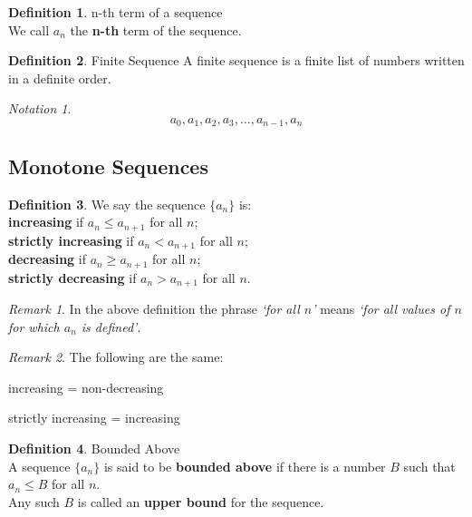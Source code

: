 \documentclass[10pt,a4paper,titlepage,twoside,draft]{article}
\theoremstyle{plain}
\theoremstyle{definition}
\newtheorem{defn}{Definition}
\theoremstyle{remark}
\newtheorem{rem}{Remark}
\newtheorem{nota}{Notation}
\begin{document}
\smallskip

\begin{defn}{n-th term of a sequence} \\
We call $a_{n}$ the \textbf{n-th} term of the sequence.
\end{defn}

\medskip

\begin{defn}{Finite Sequence} 
A finite sequence is a finite list of numbers written in a definite order.
\end{defn}

\smallskip

\begin{nota}
\[ a_{0}, a_{1}, a_{2}, a_{3}, \ldots, a_{n-1}, a_{n} \]
\end{nota}

\subsection{Monotone Sequences}

\begin{defn} 
We say the sequence $\{a_{n} \}$ is: \\
\textbf{increasing} if $a_{n} \leq a_{n+1}$ for all $n$; \\
\textbf{strictly increasing} if $a_{n} < a_{n+1}$ for all $n$; \\
\textbf{decreasing} if $a_{n} \geq a_{n+1}$ for all $n$; \\
\textbf{strictly decreasing} if $a_{n} > a_{n+1}$ for all $n$.
\end{defn}

\medskip

\begin{rem}
In the above definition the phrase \textit{`for all $n$'} means \textit{`for all values of $n$ for which $a_{n}$ is defined'}.
\end{rem}

\medskip

\begin{rem}
The following are the same:

increasing = non-decreasing

strictly increasing = increasing 
\end{rem}

\bigskip

\begin{defn}{Bounded Above} \\
A sequence $\{ a_{n} \}$ is said to be \textbf{bounded above} if there is a number $B$ such that $a_{n} \leq B$ for all $n$. \\
Any such $B$ is called an \textbf{upper bound} for the sequence.
\end{defn}
\end{document}

